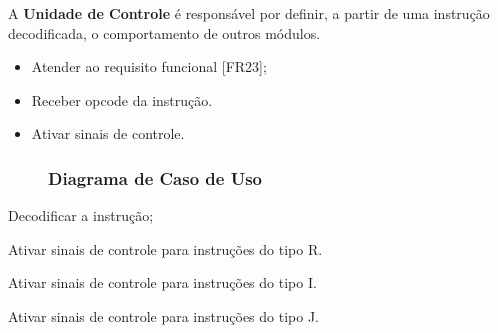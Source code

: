  
    A \textbf{Unidade de Controle} é responsável por definir, a partir de uma instrução decodificada, o comportamento de outros módulos.
  
  \actors
    \begin{description}
    \end{description}
  
  \preconditions 
    \begin{itemize}
     \item Atender ao requisito funcional [FR23];
     \item Receber opcode da instrução.
    \end{itemize}

  \postconditions
    \begin{itemize}
      \item Ativar sinais de controle.
    \end{itemize}
  
    \begin{landscape} 
    \begin{figure}
  \subsubsection*{Diagrama de Caso de Uso}
  	
  	\end{figure}
 	\end{landscape}
 
  
  \begin{mainflow}
    \item Decodificar a instrução;
  \end{mainflow}
  
  \begin{secondaryflow} 
     \item Ativar sinais de controle para instruções do tipo R.
     \item Ativar sinais de controle para instruções do tipo I.
     \item Ativar sinais de controle para instruções do tipo J.
 \end{secondaryflow}